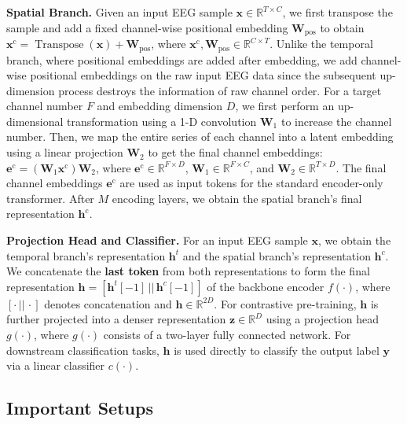 \textbf{Spatial Branch.}
Given an input EEG sample $\bm{x} \in \mathbb{R}^{T \times C}$, we first transpose the sample and add a fixed channel-wise positional embedding $\bm{W}_{\text{pos}}$ to obtain $\bm{x}^{\text{c}} = \operatorname{Transpose}(\bm{x}) + \bm{W}_{\text{pos}}$, where $\bm{x}^{\text{c}}, \bm{W}_{\text{pos}} \in \mathbb{R}^{C \times T}$. Unlike the temporal branch, where positional embeddings are added after embedding, we add channel-wise positional embeddings on the raw input EEG data since the subsequent up-dimension process destroys the information of raw channel order. For a target channel number $F$ and embedding dimension $D$, we first perform an up-dimensional transformation using a 1-D convolution $\bm{W}_1$ to increase the channel number. Then, we map the entire series of each channel into a latent embedding using a linear projection $\bm{W}_2$ to get the final channel embeddings: $\bm{e}^{\text{c}} = (\bm{W}_1 \bm{x}^{\text{c}}) \bm{W}_2$, where $\bm{e}^{\text{c}} \in \mathbb{R}^{F \times D}$, $\bm{W}_1 \in \mathbb{R}^{F \times C}$, and $\bm{W}_2 \in \mathbb{R}^{T \times D}$. The final channel embeddings $\bm{e}^{\text{c}}$ are used as input tokens for the standard encoder-only transformer. After $M$ encoding layers, we obtain the spatial branch's final representation $\bm{h}^{\text{c}}$. 




\textbf{Projection Head and Classifier.}
For an input EEG sample $\bm{x}$, we obtain the temporal branch's representation $\bm{h}^t$ and the spatial branch's representation $\bm{h}^c$. We concatenate the \textbf{last token} from both representations to form the final representation $\bm{h} = \left[\bm{h}^t[-1] \,||\, \bm{h}^c[-1]\right]$ of the backbone encoder $f(\cdot)$, where $\left[\cdot \,||\, \cdot\right]$ denotes concatenation and $\bm{h} \in \mathbb{R}^{2D}$. For contrastive pre-training, $\bm{h}$ is further projected into a denser representation $\bm{z} \in \mathbb{R}^{D}$ using a projection head $g(\cdot)$, where $g(\cdot)$ consists of a two-layer fully connected network. For downstream classification tasks, $\bm{h}$ is used directly to classify the output label $\bm{y}$ via a linear classifier $c(\cdot)$.




\subsection{Important Setups}
\label{sub:important_setups}

